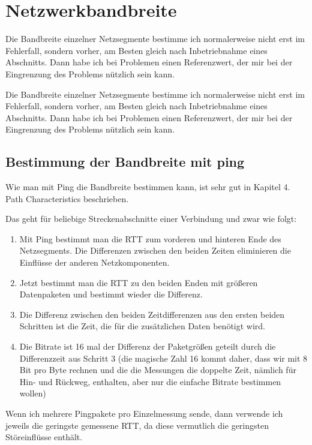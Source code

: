 \section{Netzwerkbandbreite}
\label{sec:netz-performance-bandbreite}
\begin{abstractsec}
  Die Bandbreite einzelner Netzsegmente bestimme ich normalerweise nicht erst
  im Fehlerfall, sondern vorher, am Besten gleich nach Inbetriebnahme eines
  Abschnitts. Dann habe ich bei Problemen einen Referenzwert, der mir bei der
  Eingrenzung des Problems nützlich sein kann.
\end{abstractsec}
\begin{normaltext}
  Die Bandbreite einzelner Netzsegmente bestimme ich normalerweise nicht erst
  im Fehlerfall, sondern vorher, am Besten gleich nach Inbetriebnahme eines
  Abschnitts. Dann habe ich bei Problemen einen Referenzwert, der mir bei der
  Eingrenzung des Problems nützlich sein kann.

  \subsection{Bestimmung der Bandbreite mit ping}
  Wie man mit Ping die Bandbreite bestimmen kann, ist sehr gut in
  \cite{sloan2001} Kapitel 4. Path Characteristics beschrieben.

  Das geht für beliebige Streckenabschnitte einer Verbindung und zwar wie
  folgt:
  \begin{enumerate}
    \item Mit Ping bestimmt man die RTT zum vorderen und hinteren Ende des
      Netzsegments. Die Differenzen zwischen den beiden Zeiten eliminieren die
      Einflüsse der anderen Netzkomponenten.
    \item Jetzt bestimmt man die RTT zu den beiden Enden mit größeren
      Datenpaketen und bestimmt wieder die Differenz.
    \item Die Differenz zwischen den beiden Zeitdifferenzen aus den ersten
      beiden Schritten ist die Zeit, die für die zusätzlichen Daten benötigt
      wird.
    \item Die Bitrate ist 16 mal der Differenz der Paketgrößen geteilt
      durch die Differenzzeit aus Schritt 3 (die magische Zahl 16 kommt daher,
      dass wir mit 8 Bit pro Byte rechnen und die die Messungen die doppelte
      Zeit, nämlich für Hin- und Rückweg, enthalten, aber nur die einfache
      Bitrate bestimmen wollen)
  \end{enumerate}
  Wenn ich mehrere Pingpakete pro Einzelmessung sende, dann verwende ich
  jeweils die geringste gemessene RTT, da diese vermutlich die geringsten
  Störeinflüsse enthält.
\end{normaltext}

